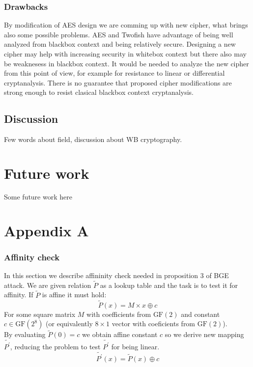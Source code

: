 \documentclass[11pt,oneside,final]{fithesis2}
\begin{document}
    \subsection*{Drawbacks}
    By modification of AES design we are comming up with new cipher, what brings also some possible problems. AES and Twofish have advantage of being well analyzed from blackbox 
    context and being relatively secure. Designing a new cipher may help with increasing security in whitebox context but there also may be weaknesess in blackbox context. 
    It would be needed to analyze the new cipher from this point of view, for example for resistance to linear or differential cryptanalysis. There is no guarantee that 
    proposed cipher modifications are strong enough to resist clasical blackbox context cryptanalysis.
    
    \section{Discussion}
    Few words about field, discussion about WB cryptography.
    
\chapter{Future work}\label{sec:futurework}
    Some future work here

\appendix

\chapter{Appendix A}
    \subsection{Affinity check}\label{appendix:affcheck}
    In this section we describe affininity check needed in proposition 3 of BGE attack. We are given relation $\widetilde{P}$ as a lookup table
    and the task is to test it for affinity. If $\widetilde{P}$ is affine it must hold:
    \begin{equation}
	\widetilde{P}\left(x\right) = M \times x \oplus c
    \end{equation}
    For some square matrix $M$ with coefficients from $\text{GF}(2)$ and constant $c \in \text{GF}(2^8)$ (or equivalently $8\times1$ vector with coeficients from $\text{GF}(2)$).\\
    
    By evaluating $\widetilde{P}\left(0\right) = c$ we obtain affine constant $c$ so we derive new mapping $\widetilde{P^\prime}$,
    reducing the problem to test $\widetilde{P^\prime}$ for being linear.
    \begin{equation}
	\widetilde{P^\prime} \left(x\right) = \widetilde{P}\left(x\right) \oplus c
    \end{equation}
   
\end{document}
